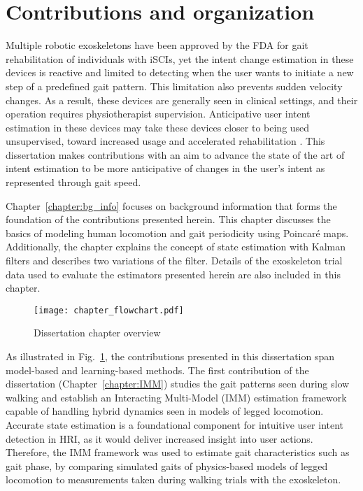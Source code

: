 \section{Contributions and organization}\label{sec:contribution}

Multiple robotic exoskeletons have been approved by the FDA for gait rehabilitation of individuals with iSCIs, yet the intent change estimation in these devices is reactive and limited to detecting when the user wants to initiate a new step of a predefined gait pattern. This limitation also prevents sudden velocity changes. As a result, these devices are generally seen in clinical settings, and their operation requires physiotherapist supervision. Anticipative user intent estimation in these devices may take these devices closer to being used unsupervised, toward increased usage and accelerated rehabilitation \cite{hidler2011role}. This dissertation makes contributions with an aim to advance the state of the art of intent estimation to be more anticipative of changes in the user's intent as represented through gait speed.

Chapter~\ref{chapter:bg_info} focuses on background information that forms the foundation of the contributions presented herein. This chapter discusses the basics of modeling human locomotion and gait periodicity using Poincar\'e maps. Additionally, the chapter explains the concept of state estimation with Kalman filters and describes two variations of the filter. Details of the exoskeleton trial data used to evaluate the estimators presented herein are also included in this chapter.

\begin{figure}
	\centering
	\texttt{[image: chapter\_flowchart.pdf]}
	\caption{Dissertation chapter overview \label{fig:chapter_flowchart}}
\end{figure}

As illustrated in Fig.~\ref{fig:chapter_flowchart}, the contributions presented in this dissertation span model-based and learning-based methods. The first contribution of the dissertation (Chapter~\ref{chapter:IMM}) studies the gait patterns seen during slow walking and establish an Interacting Multi-Model (IMM) estimation framework capable of handling hybrid dynamics seen in models of legged locomotion. Accurate state estimation is a foundational component for intuitive user intent detection in HRI, as it would deliver increased insight into user actions. Therefore, the IMM framework was used to estimate gait characteristics such as gait phase, by comparing simulated gaits of physics-based models of legged locomotion to measurements taken during walking trials with the exoskeleton. 

